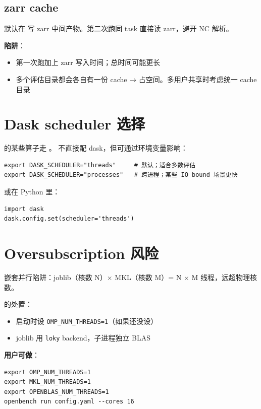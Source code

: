 \subsection{zarr cache}

\openbench{} 默认在  写 zarr 中间产物。第二次跑同 task 直接读 zarr，避开 NC 解析。

\textbf{陷阱}：

\begin{itemize}
  \item 第一次跑加上 zarr 写入时间；总时间可能更长
  \item 多个评估目录都会各自有一份 cache → 占空间。多用户共享时考虑统一 cache 目录
\end{itemize}

\section{Dask scheduler 选择}

 的某些算子走 。\openbench{} 不直接配 dask，但可通过环境变量影响：

\begin{verbatim}
export DASK_SCHEDULER="threads"     # 默认；适合多数评估
export DASK_SCHEDULER="processes"   # 跨进程；某些 IO bound 场景更快
\end{verbatim}

或在 Python 里：

\begin{verbatim}
import dask
dask.config.set(scheduler='threads')
\end{verbatim}

\section{Oversubscription 风险}

嵌套并行陷阱：joblib（核数 N）× MKL（核数 M）= N × M 线程，远超物理核数。

\openbench{} 的处置：

\begin{itemize}
  \item 启动时设 \texttt{OMP\_NUM\_THREADS=1}（如果还没设）
  \item joblib 用 \texttt{loky} backend，子进程独立 BLAS
\end{itemize}

\textbf{用户可做}：

\begin{verbatim}
export OMP_NUM_THREADS=1
export MKL_NUM_THREADS=1
export OPENBLAS_NUM_THREADS=1
openbench run config.yaml --cores 16
\end{verbatim}

